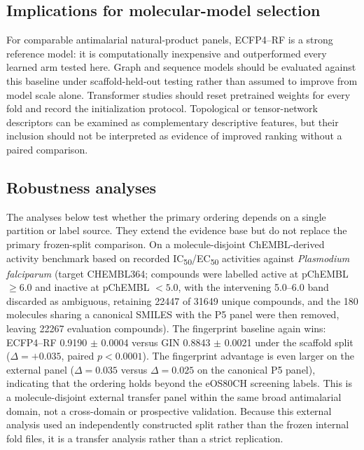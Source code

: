 \documentclass[11pt,a4paper]{article}
\begin{document}
\subsection{Implications for molecular-model selection}

For comparable antimalarial natural-product panels, ECFP4--RF is a strong reference model: it is computationally inexpensive and outperformed every learned arm tested here. Graph and sequence models should be evaluated against this baseline under scaffold-held-out testing rather than assumed to improve from model scale alone. Transformer studies should reset pretrained weights for every fold and record the initialization protocol. Topological or tensor-network descriptors can be examined as complementary descriptive features, but their inclusion should not be interpreted as evidence of improved ranking without a paired comparison.

\subsection{Robustness analyses}

The analyses below test whether the primary ordering depends on a single partition or label source. They extend the evidence base but do not replace the primary frozen-split comparison. On a molecule-disjoint ChEMBL-derived activity benchmark based on recorded IC\textsubscript{50}/EC\textsubscript{50} activities against \emph{Plasmodium falciparum} (target CHEMBL364; compounds were labelled active at pChEMBL $\geq \num{6.0}$ and inactive at pChEMBL $< \num{5.0}$, with the intervening \num{5.0}--\num{6.0} band discarded as ambiguous, retaining \num{22447} of \num{31649} unique compounds, and the \num{180} molecules sharing a canonical SMILES with the P5 panel were then removed, leaving \num{22267} evaluation compounds). The fingerprint baseline again wins: ECFP4--RF \num{0.9190} $\pm$ \num{0.0004} versus GIN \num{0.8843} $\pm$ \num{0.0021} under the scaffold split ($\Delta = +\num{0.035}$, paired $p < \num{0.0001}$). The fingerprint advantage is even larger on the external panel ($\Delta = \num{0.035}$ versus $\Delta = \num{0.025}$ on the canonical P5 panel), indicating that the ordering holds beyond the eOS80CH screening labels. This is a molecule-disjoint external transfer panel within the same broad antimalarial domain, not a cross-domain or prospective validation. Because this external analysis used an independently constructed split rather than the frozen internal fold files, it is a transfer analysis rather than a strict replication.
\end{document}
